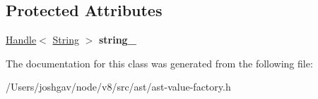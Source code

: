 \subsection*{Protected Attributes}
\begin{DoxyCompactItemize}
\item 
\hyperlink{classv8_1_1internal_1_1_handle}{Handle}$<$ \hyperlink{classv8_1_1internal_1_1_string}{String} $>$ {\bfseries string\+\_\+}\hypertarget{classv8_1_1internal_1_1_ast_string_a031e411435d4c2749b7391eb9b3e18ae}{}\label{classv8_1_1internal_1_1_ast_string_a031e411435d4c2749b7391eb9b3e18ae}

\end{DoxyCompactItemize}


The documentation for this class was generated from the following file\+:\begin{DoxyCompactItemize}
\item 
/\+Users/joshgav/node/v8/src/ast/ast-\/value-\/factory.\+h\end{DoxyCompactItemize}
